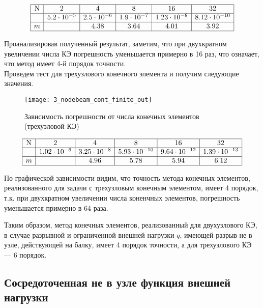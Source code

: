 \documentclass[12pt,a4paper]{article}
\begin{document}
\[
\begin{array}{|c|c|c|c|c|c|}
\hline
\text{N} & 2 & 4 & 8 & 16 & 32 \\ \hline
\Delta  & 5.2 \cdot 10^{-5} & 2.5 \cdot 10^{-6} & 1.9 \cdot 10^{-7} & 1.23 \cdot 10^{-8} & 8.12 \cdot 10^{-10} \\ \hline
m  &  & 4.38 & 3.64 & 4.01 & 3.92 \\ 
\hline
\end{array}
\]

Проанализировав полученный результат, заметим, что при двухкратном увеличении числа КЭ погрешность уменьшается примерно в 16 раз, что означает, что метод имеет 4-й порядок точности.\\


 Проведем тест для трехузлового конечного элемента и получим следующие значения. 
\begin{figure}[H]
		\centering
		\texttt{[image: 3\_nodebeam\_cont\_finite\_out]}
		\caption{Зависимость погрешности от числа конечных элементов (трехузловой КЭ)}
		\label{fig:3_nodebeam_cont_finite_out}
	\end{figure}


\[
\begin{array}{|c|c|c|c|c|c|}
\hline
\text{N} & 2 & 4 & 8 & 16 & 32\\ \hline
\Delta  & 1.02 \cdot 10^{-6} & 3.25 \cdot 10^{-8} & 5.93 \cdot 10^{-10} & 9.64 \cdot 10^{-12} & 1.39 \cdot 10^{-13}\\ \hline
m  &  &  4.96 & 5.78 & 5.94 & 6.12 \\ 
\hline
\end{array}
\]

По графической зависимости видим, что точность метода конечных элементов, реализованного для задачи с 	трехузловым конечным элементом, имеет 4 порядок, т.к. при двухкратном увеличении числа коненчных элементов, погрешность уменьшается примерно в 64 раза. 


Таким образом, метод конечных элементов, реализованный для двухузлового КЭ, в случае разрывной и ограниченной внешней нагрузки $q$, имеющей разрыв не в узле, действующей на балку, имеет 4 порядок точности, а для трехузлового КЭ --- 6 порядок. 

\subsection[Сосредоточенная функция внешней нагрузки]{Сосредоточенная не в узле функция внешней нагрузки}
\end{document}
